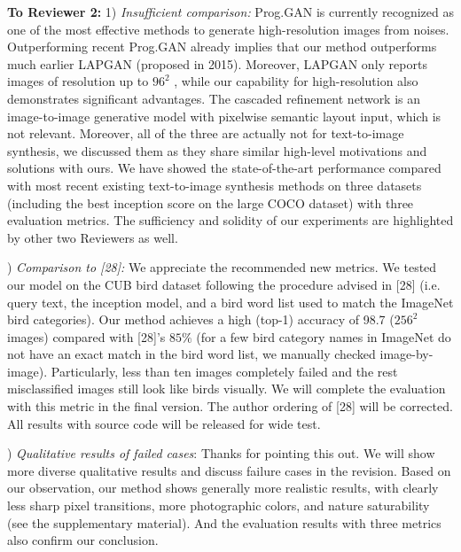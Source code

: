 \documentclass[10pt,twocolumn,letterpaper]{article}
\begin{document}

\noindent
\textbf{To Reviewer 2:} 1) \textit{Insufficient comparison: } Prog.GAN is currently recognized as one of the most effective methods to generate high-resolution images from noises. %
Outperforming recent Prog.GAN already implies that our method outperforms much earlier LAPGAN (proposed in 2015). Moreover, LAPGAN only reports images of resolution up to $96^2$ , while our capability for high-resolution also demonstrates significant advantages. The cascaded refinement network is an image-to-image generative model with pixelwise semantic layout input, which is not relevant. Moreover, all of the three are actually not for text-to-image synthesis,%
we discussed them as they share similar high-level motivations and solutions with ours. We have showed the state-of-the-art performance compared with most recent existing text-to-image synthesis methods on three datasets (including the best inception score on the large COCO dataset) with three evaluation metrics.  The sufficiency and solidity of our experiments are highlighted by other two Reviewers as well. 


) \textit{Comparison to [28]: } We appreciate the recommended new metrics. We tested our model on the CUB bird dataset following the procedure advised in [28] (i.e. query text, the inception model, and a bird word list used to match the ImageNet bird categories). Our method achieves a high (top-1) accuracy of 98.7 ($256^2$ images) compared with [28]'s $85\%$ (for a few bird category names in ImageNet do not have an exact match in the bird word list, we manually checked image-by-image). Particularly, less than ten images completely failed and the rest misclassified images still look like birds visually. We will complete the evaluation with this metric in the final version. The author ordering of [28] will be corrected. All results with source code will be released for wide test. 

) \textit{Qualitative results of failed cases}: Thanks for pointing this out. We will show more diverse qualitative results and discuss failure cases in the revision. Based on our observation, our method shows generally more realistic results, with clearly less sharp pixel transitions, more photographic colors, and nature saturability (see the supplementary material). And the evaluation results with three metrics also confirm our conclusion.
\end{document}
